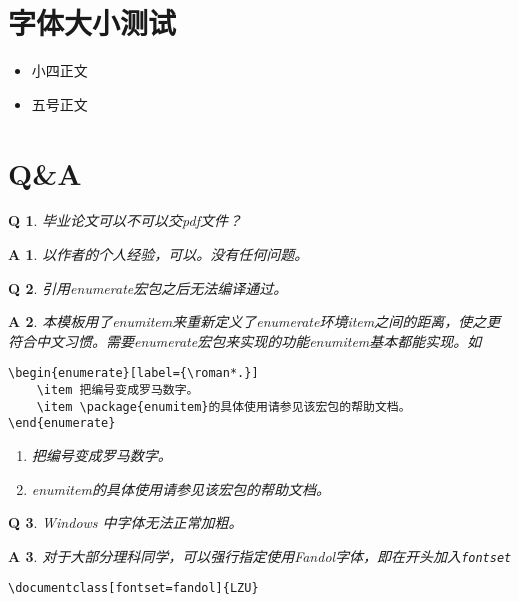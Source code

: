 \documentclass[oneside]{LZU}
\newcommand{\package}[1]{{\sffamily #1}}
\newtheorem*{answer}{A}
\newtheorem{question}{Q}
\begin{document}
\section{字体大小测试}
\begin{itemize}
    \item {小四}正文
    \item {五号}正文
\end{itemize}

\backmatter
\nocite{*}
\printbibliography[title={参考文献},heading=bibintoc]
\Appendix
\section{Q\&A}
\begin{question}
    毕业论文可以不可以交pdf文件？
\end{question}
\begin{answer}
    以作者的个人经验，可以。没有任何问题。
\end{answer}
\begin{question}
    引用\package{enumerate}宏包之后无法编译通过。
\end{question}
\begin{answer}
    本模板用了\package{enumitem}来重新定义了enumerate环境item之间的距离，使之更符合中文习惯。需要\package{enumerate}宏包来实现的功能\package{enumitem}基本都能实现。如
\begin{verbatim}
\begin{enumerate}[label={\roman*.}]
    \item 把编号变成罗马数字。
    \item \package{enumitem}的具体使用请参见该宏包的帮助文档。
\end{enumerate}
\end{verbatim}
    \begin{enumerate}[label={\roman*.}]
        \item 把编号变成罗马数字。
        \item \package{enumitem}的具体使用请参见该宏包的帮助文档。
    \end{enumerate}
\end{answer}
\begin{question}
    Windows 中字体无法正常加粗。
\end{question}
\begin{answer}
    对于大部分理科同学，可以强行指定使用Fandol字体，即在开头加入\texttt{fontset}
\begin{verbatim}
\documentclass[fontset=fandol]{LZU}
\end{verbatim}
\end{answer}
\end{document}
